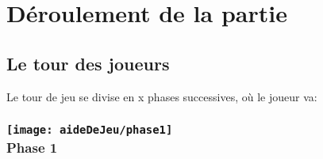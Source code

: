 \section*{Déroulement de la partie} \label{sec:déroulementPartie}
 
\subsection*{Le tour des joueurs}
\label{sec:tourJeu}

Le tour de jeu se divise en x phases successives, où le joueur va:
\subsubsection*{\texttt{[image: aideDeJeu/phase1]} \\ Phase 1 }
